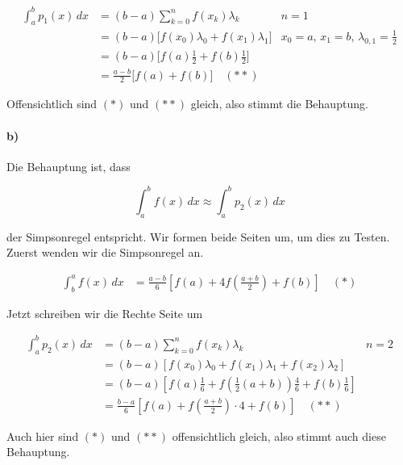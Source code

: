 \documentclass[ngerman,a4paper]{scrartcl}
\begin{document}
\begin{align*}
  \int^b_a p_1(x)\, dx &= (b-a) \sum^n_{k=0} f(x_k) \lambda_k & n = 1\\
  &= (b-a)\big[f(x_0)\lambda_0 + f(x_1)\lambda_1\big] &  x_0 = a,\, x_1 = b,\, \lambda_{0,1}
  = \frac{1}{2}\\
  &= (b-a)\big[f(a)\frac{1}{2} + f(b)\frac{1}{2}\big]\\
  &= \frac{a-b}{2} \big[f(a) + f(b)\big] \quad (**)
\end{align*}

Offensichtlich sind $(*)$ und $(**)$ gleich, also stimmt die Behauptung.

\paragraph{b)}

Die Behauptung ist, dass 

\[
\int^b_a f(x)\, dx \approx \int^b_a p_2(x)\, dx
\]

der Simpsonregel entspricht. Wir formen beide Seiten um, um dies zu
Testen. Zuerst wenden wir die Simpsonregel an.

\begin{align*}
  \int^a_b f(x)\, dx &= \frac{a-b}{6} \left[ f(a) +
    4f\left(\frac{a+b}{2}\right) + f(b)\right] \quad (*)
\end{align*}

Jetzt schreiben wir die Rechte Seite um

\begin{align*}
  \int^b_a p_2(x)\, dx &= (b-a) \sum^n_{k=0} f(x_k) \lambda_k & n = 2\\
  &= (b-a)\left[f(x_0)\lambda_0 + f\left(x_1\right)\lambda_1 +
    f(x_2)\lambda_2\right]\\
  &= (b-a)\left[f(a)\frac{1}{6} +
    f\left(\frac{1}{2}(a+b)\right)\frac{4}{6} +
    f(b)\frac{1}{6}\right]\\
  &= \frac{b-a}{6} \left[f(a) + f\left(\frac{a+b}{2}\right)\cdot 4 +
    f(b) \right] \quad (**)
\end{align*}

Auch hier sind $(*)$ und $(**)$ offensichtlich gleich, also stimmt
auch diese Behauptung.
\end{document}
